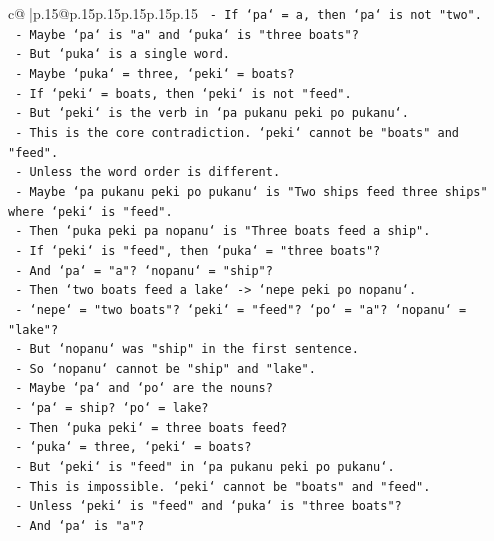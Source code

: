 \documentclass{article}
\begin{document}
{\begin{supertabular}{c@{$\;$}|p{.15\linewidth}@{}p{.15\linewidth}p{.15\linewidth}p{.15\linewidth}p{.15\linewidth}p{.15\linewidth}}
{{{\texttt{        {-} If `pa` = a, then `pa` is not "two".} \\
\texttt{        {-} Maybe `pa` is "a" and `puka` is "three boats"?} \\
\texttt{        {-} But `puka` is a single word.} \\
\texttt{        {-} Maybe `puka` = three, `peki` = boats?} \\
\texttt{        {-} If `peki` = boats, then `peki` is not "feed".} \\
\texttt{        {-} But `peki` is the verb in `pa pukanu peki po pukanu`.} \\
\texttt{        {-} This is the core contradiction. `peki` cannot be "boats" and "feed".} \\
\texttt{        {-} Unless the word order is different.} \\
\texttt{        {-} Maybe `pa pukanu peki po pukanu` is "Two ships feed three ships" where `peki` is "feed".} \\
\texttt{        {-} Then `puka peki pa nopanu` is "Three boats feed a ship".} \\
\texttt{        {-} If `peki` is "feed", then `puka` = "three boats"?} \\
\texttt{        {-} And `pa` = "a"? `nopanu` = "ship"?} \\
\texttt{        {-} Then `two boats feed a lake` {-}> `nepe peki po nopanu`.} \\
\texttt{          {-} `nepe` = "two boats"? `peki` = "feed"? `po` = "a"? `nopanu` = "lake"?} \\
\texttt{          {-} But `nopanu` was "ship" in the first sentence.} \\
\texttt{          {-} So `nopanu` cannot be "ship" and "lake".} \\
\texttt{          {-} Maybe `pa` and `po` are the nouns?} \\
\texttt{          {-} `pa` = ship? `po` = lake?} \\
\texttt{          {-} Then `puka peki` = three boats feed?} \\
\texttt{          {-} `puka` = three, `peki` = boats?} \\
\texttt{          {-} But `peki` is "feed" in `pa pukanu peki po pukanu`.} \\
\texttt{          {-} This is impossible. `peki` cannot be "boats" and "feed".} \\
\texttt{          {-} Unless `peki` is "feed" and `puka` is "three boats"?} \\
\texttt{          {-} And `pa` is "a"?} \\
}}}
\end{supertabular}}
\end{document}
